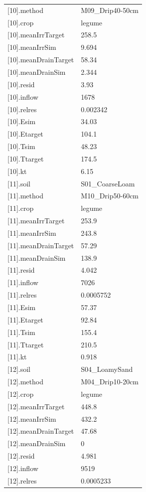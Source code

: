 {\begin{longtable}{p{}p{}}
{}[10].method & M09\_Drip40-50cm\\
{}[10].crop & legume\\
{}[10].meanIrrTarget & 258.5\\
{}[10].meanIrrSim & 9.694\\
{}[10].meanDrainTarget & 58.34\\
{}[10].meanDrainSim & 2.344\\
{}[10].resid & 3.93\\
{}[10].inflow & 1678\\
{}[10].relres & 0.002342\\
{}[10].Esim & 34.03\\
{}[10].Etarget & 104.1\\
{}[10].Tsim & 48.23\\
{}[10].Ttarget & 174.5\\
{}[10].kt & 6.15\\
{}[11].soil & S01\_CoarseLoam\\
{}[11].method & M10\_Drip50-60cm\\
{}[11].crop & legume\\
{}[11].meanIrrTarget & 253.9\\
{}[11].meanIrrSim & 243.8\\
{}[11].meanDrainTarget & 57.29\\
{}[11].meanDrainSim & 138.9\\
{}[11].resid & 4.042\\
{}[11].inflow & 7026\\
{}[11].relres & 0.0005752\\
{}[11].Esim & 57.37\\
{}[11].Etarget & 92.84\\
{}[11].Tsim & 155.4\\
{}[11].Ttarget & 210.5\\
{}[11].kt & 0.918\\
{}[12].soil & S04\_LoamySand\\
{}[12].method & M04\_Drip10-20cm\\
{}[12].crop & legume\\
{}[12].meanIrrTarget & 448.8\\
{}[12].meanIrrSim & 432.2\\
{}[12].meanDrainTarget & 47.68\\
{}[12].meanDrainSim & 0\\
{}[12].resid & 4.981\\
{}[12].inflow & 9519\\
{}[12].relres & 0.0005233\\

\end{longtable}}
